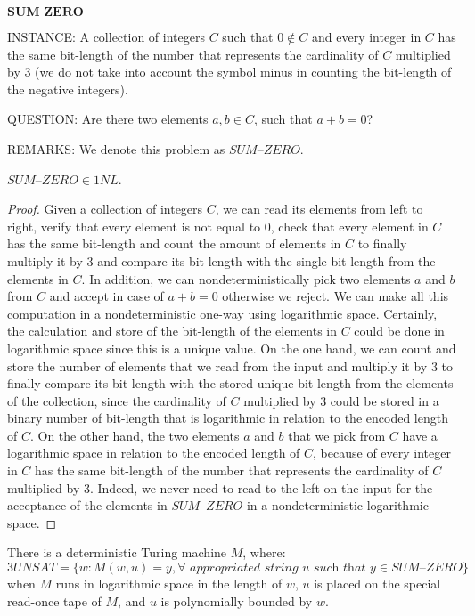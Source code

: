 \documentclass[a4paper,UKenglish,cleveref, autoref]{lipics-v2019}
\begin{document}
\begin{definition}
$\textbf{SUM ZERO}$

INSTANCE: A collection of integers $C$ such that $0 \notin C$ and every integer in $C$ has the same bit-length of the number that represents the cardinality of $C$ multiplied by $3$ (we do not take into account the symbol minus in counting the bit-length of the negative integers).

QUESTION: Are there two elements $a, b \in C$, such that $a + b = 0$?

REMARKS: We denote this problem as $\textit{SUM--ZERO}$.
\end{definition}


\begin{theorem}
\label{1nl}
$\textit{SUM--ZERO} \in 1NL$.
\end{theorem}

\begin{proof}
Given a collection of integers $C$, we can read its elements from left to right, verify that every element is not equal to $0$, check that every element in $C$ has the same bit-length and count the amount of elements in $C$ to finally multiply it by $3$ and compare its bit-length with the single bit-length from the elements in $C$. In addition, we can nondeterministically pick two elements $a$ and $b$ from $C$ and accept in case of $a + b = 0$ otherwise we reject. We can make all this computation in a nondeterministic one-way using logarithmic space. Certainly, the calculation and store of the bit-length of the elements in $C$ could be done in logarithmic space since this is a unique value. On the one hand, we can count and store the number of elements that we read from the input and multiply it by $3$ to finally compare its bit-length with the stored unique bit-length from the elements of the collection, since the cardinality of $C$ multiplied by $3$ could be stored in a binary number of bit-length that is logarithmic in relation to the encoded length of $C$. On the other hand, the two elements $a$ and $b$ that we pick from $C$ have a logarithmic space in relation to the encoded length of $C$, because of every integer in $C$ has the same bit-length of the number that represents the cardinality of $C$ multiplied by $3$. Indeed, we never need to read to the left on the input for the acceptance of the elements in $\textit{SUM--ZERO}$ in a nondeterministic logarithmic space.
\end{proof}

\begin{theorem}
\label{demonstration}
There is a deterministic Turing machine $M$, where:
\[3UNSAT = \{w: M(w, u) = y, \forall \textit{ appropriated string } u \textit{ such that } y \in \textit{SUM--ZERO}\}\]
when $M$ runs in logarithmic space in the length of $w$, $u$ is placed on the special read-once tape of $M$, and $u$ is polynomially bounded by $w$.
\end{theorem}
\end{document}
